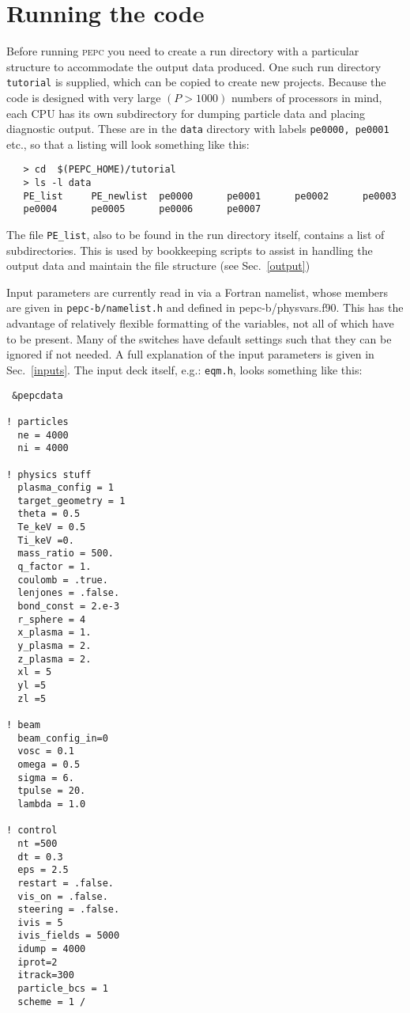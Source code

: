 \documentclass[11pt,psfig]{article}
\begin{document}
\section{Running the code}

Before running \textsc{pepc} you need to create a run directory with a
particular structure to accommodate the output data produced.  One such run
directory {\tt tutorial} is supplied, which can be copied to create new
projects. Because the
code is designed with very large $(P>1000)$ numbers of processors in mind,
each CPU has its own subdirectory for dumping particle data and placing
diagnostic output.  These are in the {\tt data} directory with labels
{\tt pe0000, pe0001} etc., so that a listing will look something like this:
\begin{verbatim}
   > cd  $(PEPC_HOME)/tutorial
   > ls -l data
   PE_list     PE_newlist  pe0000      pe0001      pe0002      pe0003  
   pe0004      pe0005      pe0006      pe0007
\end{verbatim}

\noindent 
The file {\tt PE\_list}, also to be found in the run directory itself, contains
a list of subdirectories.  This is used by bookkeeping scripts to assist in handling the
output data and maintain the file structure (see Sec.~\ref{output})



\medskip\noindent
Input parameters are currently read in via a Fortran namelist, whose members
are given in {\tt pepc-b/namelist.h} and defined in pepc-b/physvars.f90.  This has the advantage of relatively
flexible formatting of the variables, not all of which have to be present.
Many of the switches have default settings such that they can be ignored if
not needed.  A full explanation of the input parameters is given in
Sec.~\ref{inputs}. The input deck itself, e.g.: {\tt eqm.h}, looks something
like this:

\small
\begin{verbatim}
 &pepcdata

! particles
  ne = 4000
  ni = 4000

! physics stuff
  plasma_config = 1  
  target_geometry = 1   
  theta = 0.5
  Te_keV = 0.5 
  Ti_keV =0.
  mass_ratio = 500.
  q_factor = 1.
  coulomb = .true.
  lenjones = .false.
  bond_const = 2.e-3
  r_sphere = 4
  x_plasma = 1.    
  y_plasma = 2.     
  z_plasma = 2.     
  xl = 5  
  yl =5
  zl =5

! beam
  beam_config_in=0  
  vosc = 0.1
  omega = 0.5
  sigma = 6.
  tpulse = 20.
  lambda = 1.0   

! control
  nt =500
  dt = 0.3
  eps = 2.5
  restart = .false.
  vis_on = .false.
  steering = .false.
  ivis = 5
  ivis_fields = 5000
  idump = 4000
  iprot=2
  itrack=300
  particle_bcs = 1
  scheme = 1 /
\end{verbatim}
\end{document}
